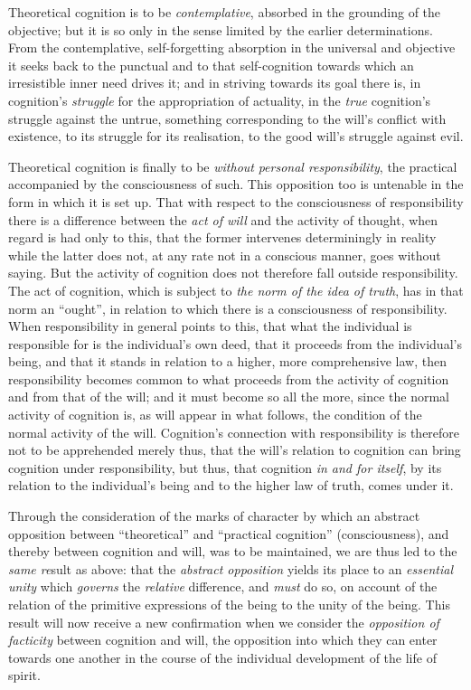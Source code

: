 \documentclass[12pt,a4paper]{book}
\begin{document}
Theoretical cognition is to be \emph{contemplative}, absorbed in the grounding
of the objective; but it is so only in the sense limited by the earlier
determinations. From the contemplative, self-forgetting absorption in the
universal and objective it seeks back to the punctual and to that
self-cognition towards which an irresistible inner need drives it; and in
striving towards its goal there is, in cognition's \emph{struggle} for the
appropriation of actuality, in the \emph{true} cognition's struggle against
the untrue, something corresponding to the will's conflict with existence, to
its struggle for its realisation, to the good will's struggle against evil.

Theoretical cognition is finally to be \emph{without}
\emph{personal responsibility}, the practical accompanied by the consciousness
of such. This opposition too is untenable in the form in which it is set up.
That with respect to the consciousness of responsibility there is a difference
between the \emph{act of will} and the activity of thought, when regard is had
only to this, that the former intervenes determiningly in reality while the
latter does not, at any rate not in a conscious manner, goes without saying.
But the activity of cognition does not therefore fall outside responsibility.
The act of cognition, which is subject to \emph{the norm of the idea of
truth}, has in that norm an ``ought'', in relation to which there is a
consciousness of responsibility. When responsibility in general points to
this, that what the individual is responsible for is the individual's own
deed, that it proceeds from the individual's being, and that it stands in
relation to a higher, more comprehensive law, then responsibility becomes
common to what proceeds from the activity of cognition and from that of the
will; and it must become so all the more, since the normal activity of
cognition is, as will appear in what follows, the condition of the normal
activity of the will. Cognition's connection with responsibility is therefore
not to be apprehended merely thus, that the will's relation to cognition can
bring cognition under responsibility, but thus, that cognition \emph{in and
for itself}, by its relation to the individual's being and to the higher law
of truth, comes under it.

Through the consideration of the marks of character by which an abstract
opposition between ``theoretical'' and ``practical cognition''
(consciousness), and thereby between cognition and will, was to be maintained,
we are thus led to the \emph{same re}sult as above: that the \emph{abstract
opposition} yields its place to an \emph{essential unity} which
\emph{governs} the \emph{relative} difference, and \emph{must} do so, on
account of the relation of the primitive expressions of the being to the unity
of the being. This result will now receive a new confirmation when we consider
the \emph{opposition of facticity} between cognition and will, the opposition
into which they can enter towards one another in the course of the individual
development of the life of spirit.
\end{document}
